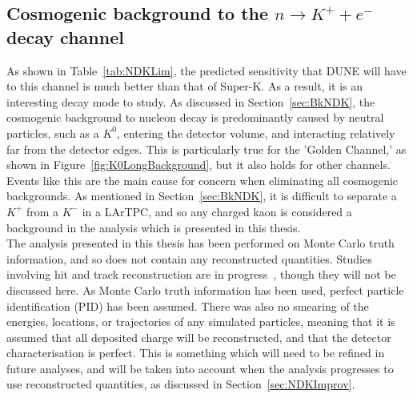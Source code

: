 \subsection{Cosmogenic background to the $n \rightarrow K^{+} + e^{-}$ decay channel} \label{sec:NDKCosmBk}
As shown in Table~\ref{tab:NDKLim}, the predicted sensitivity that DUNE will have to this channel is much better than that of Super-K. As a result, it is an interesting decay mode to study. As discussed in Section~\ref{sec:BkNDK}, the cosmogenic background to nucleon decay is predominantly caused by neutral particles, such as a $K^0$, entering the detector volume, and interacting relatively far from the detector edges. This is particularly true for the 'Golden Channel,' as shown in Figure~\ref{fig:K0LongBackground}, but it also holds for other channels. Events like this are the main cause for concern when eliminating all cosmogenic backgrounds. As mentioned in Section~\ref{sec:BkNDK}, it is difficult to separate a $K^+$ from a $K^-$ in a LArTPC, and so any charged kaon is considered a background in the analysis which is presented in this thesis. \\

The analysis presented in this thesis has been performed on Monte Carlo truth information, and so does not contain any reconstructed quantities. Studies involving hit and track reconstruction are in progress~\citep{CosmoJanCollabMeeting}, though they will not be discussed here. As Monte Carlo truth information has been used, perfect particle identification (PID) has been assumed. There was also no smearing of the energies, locations, or trajectories of any simulated particles, meaning that it is assumed that all deposited charge will be reconstructed, and that the detector characterisation is perfect. This is something which will need to be refined in future analyses, and will be taken into account when the analysis progresses to use reconstructed quantities, as discussed in Section~\ref{sec:NDKImprov}. \\ 

